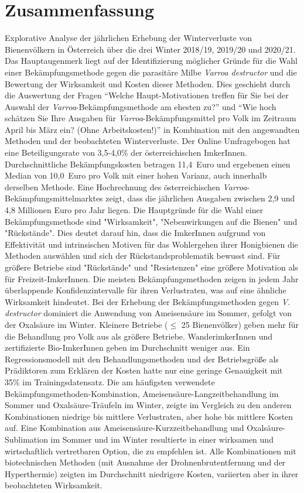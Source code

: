 \chapter*{Zusammenfassung}
\label{sec:Zusammenfassung}
\vspace*{-15mm}

Explorative Analyse der jährlichen Erhebung der Winterverluste von Bienenvölkern in Österreich über die drei Winter 2018/19, 2019/20 und 2020/21. Das Hauptaugenmerk liegt auf der Identifizierung möglicher Gründe für die Wahl einer Bekämpfungsmethode gegen die parasitäre Milbe \textit{Varroa destructor} und die Bewertung der Wirksamkeit und Kosten dieser Methoden. Dies geschieht durch die Auswertung der Fragen \enquote{Welche Haupt-Motivationen treffen für Sie bei der Auswahl der \textit{Varroa}-Bekämpfungsmethode am ehesten zu?} und \enquote{Wie hoch schätzen Sie Ihre Ausgaben für \textit{Varroa}-Bekämpfungsmittel pro Volk im Zeitraum April bis März ein? (Ohne Arbeitskosten!)} in Kombination mit den angewandten Methoden und der beobachteten Winterverluste. Der Online Umfragebogen hat eine Beteiligungsrate von 3,5-4,0\% der österreichischen ImkerInnen. Durchschnittliche Bekämpfungskosten betragen 11,4~Euro und ergebenen einen Median von 10,0~Euro pro Volk mit einer hohen Varianz, auch innerhalb derselben Methode. Eine Hochrechnung des österreichischen \textit{Varroa}-Bekämpfungsmittelmarktes zeigt, dass die jährlichen Ausgaben zwischen 2,9 und 4,8 Millionen Euro pro Jahr liegen. Die Hauptgründe für die Wahl einer Bekämpfungsmethode sind "Wirksamkeit", "Nebenwirkungen auf die Bienen" und "Rückstände". Dies deutet darauf hin, dass die ImkerInnen aufgrund von Effektivität und intrinsischen Motiven für das Wohlergehen ihrer Honigbienen die Methoden auswählen und sich der Rückstandsproblematik bewusst sind. Für größere Betriebe sind "Rückstände" und "Resistenzen" eine größere Motivation als für Freizeit-ImkerInnen. Die meisten Bekämpfungsmethoden zeigen in jedem Jahr überlappende Konfidenzintervalle für ihren Verlustraten, was auf eine ähnliche Wirksamkeit hindeutet. Bei der Erhebung der Bekämpfungsmethoden gegen \textit{V. destructor} dominiert die Anwendung von Ameisensäure im Sommer, gefolgt von der Oxalsäure im Winter. Kleinere Betriebe ($\leq$ 25 Bienenvölker) geben mehr für die Behandlung pro Volk aus als größere Betriebe. WanderimkerInnen und zertifizierte Bio-ImkerInnen geben im Durchschnitt weniger aus. Ein Regressionsmodell mit den Behandlungsmethoden und der Betriebsgröße als Prädiktoren zum Erklären der Kosten hatte nur eine geringe Genauigkeit mit 35\% im Trainingsdatensatz. Die am häufigsten verwendete Bekämpfungsmethoden-Kombination, Ameisensäure-Langzeitbehandlung im Sommer und Oxalsäure-Träufeln im Winter, zeigte im Vergleich zu den anderen Kombinationen niedrige bis mittlere Verlustraten, aber hohe bis mittlere Kosten auf. Eine Kombination aus Ameisensäure-Kurzzeitbehandlung und Oxalsäure-Sublimation im Sommer und im Winter resultierte in einer wirksamen und wirtschaftlich vertretbaren Option, die zu empfehlen ist. Alle Kombinationen mit biotechnischen Methoden (mit Ausnahme der Drohnenbrutentfernung und der Hyperthermie) zeigten im Durchschnitt niedrigere Kosten, variierten aber in ihrer beobachteten Wirksamkeit.
